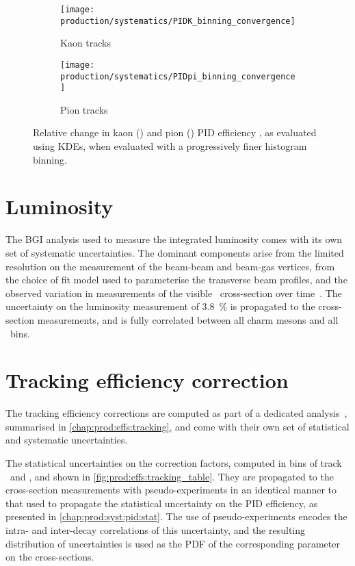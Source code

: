 \begin{figure}
  \begin{subfigure}{0.5\textwidth}
    \centering
    \texttt{[image: production/systematics/PIDK\_binning\_convergence]}
    \caption{Kaon tracks}
    \label{fig:prod:syst:pid:convergence:kaon}
  \end{subfigure}
  \begin{subfigure}{0.5\textwidth}
    \centering
    \texttt{[image: production/systematics/PIDpi\_binning\_convergence]}
    \caption{Pion tracks}
    \label{fig:prod:syst:pid:convergence:pion}
  \end{subfigure}
  \caption{%
    Relative change in kaon () and
    pion () \ac{PID} efficiency
    \effpid, as evaluated using \aclp{KDE}, when evaluated with a progressively
    finer histogram binning.
  }
  \label{fig:prod:syst:pid:convergence}
\end{figure}


\section{Luminosity}
\label{chap:prod:syst:lumi}

The \acl{BGI} analysis used to measure the integrated luminosity comes with its
own set of systematic uncertainties.
The dominant components arise from the limited resolution on the measurement of
the beam-beam and beam-gas vertices, from the choice of fit model used to
parameterise the transverse beam profiles, and the observed variation in
measurements of the visible \pp\ cross-section over
time~\cite{LHCb-PAPER-2014-047}.
The uncertainty on the luminosity measurement of \SI{3.8}{\%} is propagated to
the cross-section measurements, and is fully correlated between all charm
mesons and all \pTy\ bins.

\section{Tracking efficiency correction}
\label{chap:prod:syst:tracking}

The tracking efficiency corrections are computed as part of a dedicated
analysis~\cite{Aaij:2014pwa}, summarised in \cref{chap:prod:effs:tracking}, and
come with their own set of statistical and systematic uncertainties.

The statistical uncertainties on the correction factors, computed in bins of
track \ptot\ and \Eta, and shown in \cref{fig:prod:effs:tracking_table}.
They are propagated to the cross-section measurements with pseudo-experiments
in an identical manner to that used to propagate the statistical uncertainty on
the \ac{PID} efficiency, as presented in \cref{chap:prod:syst:pid:stat}.
The use of pseudo-experiments encodes the intra- and inter-decay correlations
of this uncertainty, and the resulting distribution of uncertainties is used as
the \ac{PDF} of the corresponding parameter on the cross-sections.


